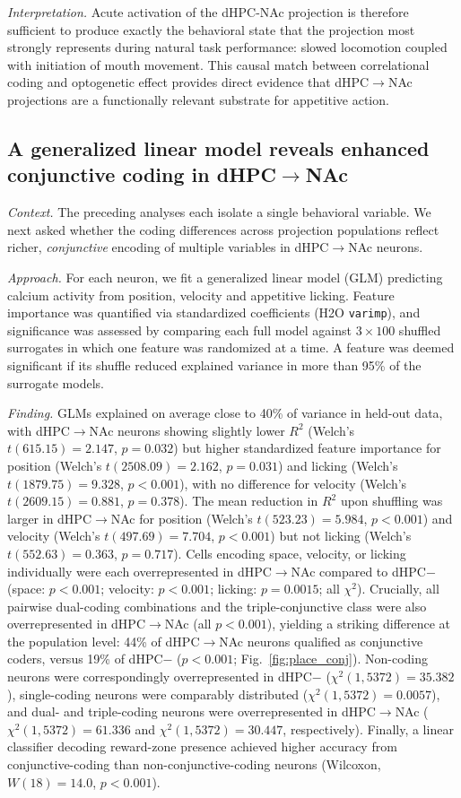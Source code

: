 \documentclass[11pt]{article}
\begin{document}
\textit{Interpretation.} Acute activation of the dHPC-NAc projection is therefore sufficient to produce exactly the behavioral state that the projection most strongly represents during natural task performance: slowed locomotion coupled with initiation of mouth movement. This causal match between correlational coding and optogenetic effect provides direct evidence that dHPC$\rightarrow$NAc projections are a functionally relevant substrate for appetitive action.

\subsection{A generalized linear model reveals enhanced conjunctive coding in dHPC$\rightarrow$NAc}

\textit{Context.} The preceding analyses each isolate a single behavioral variable. We next asked whether the coding differences across projection populations reflect richer, \emph{conjunctive} encoding of multiple variables in dHPC$\rightarrow$NAc neurons.

\textit{Approach.} For each neuron, we fit a generalized linear model (GLM) predicting calcium activity from position, velocity and appetitive licking. Feature importance was quantified via standardized coefficients (H2O \texttt{varimp}), and significance was assessed by comparing each full model against $3\times100$ shuffled surrogates in which one feature was randomized at a time. A feature was deemed significant if its shuffle reduced explained variance in more than 95\% of the surrogate models.

\textit{Finding.} GLMs explained on average close to 40\% of variance in held-out data, with dHPC$\rightarrow$NAc neurons showing slightly lower $R^2$ (Welch's $t(615.15)=2.147$, $p=0.032$) but higher standardized feature importance for position (Welch's $t(2508.09)=2.162$, $p=0.031$) and licking (Welch's $t(1879.75)=9.328$, $p<0.001$), with no difference for velocity (Welch's $t(2609.15)=0.881$, $p=0.378$). The mean reduction in $R^2$ upon shuffling was larger in dHPC$\rightarrow$NAc for position (Welch's $t(523.23)=5.984$, $p<0.001$) and velocity (Welch's $t(497.69)=7.704$, $p<0.001$) but not licking (Welch's $t(552.63)=0.363$, $p=0.717$). Cells encoding space, velocity, or licking individually were each overrepresented in dHPC$\rightarrow$NAc compared to dHPC$-$ (space: $p<0.001$; velocity: $p<0.001$; licking: $p=0.0015$; all $\chi^2$). Crucially, all pairwise dual-coding combinations and the triple-conjunctive class were also overrepresented in dHPC$\rightarrow$NAc (all $p<0.001$), yielding a striking difference at the population level: 44\% of dHPC$\rightarrow$NAc neurons qualified as conjunctive coders, versus 19\% of dHPC$-$ ($p<0.001$; Fig.~\ref{fig:place_conj}). Non-coding neurons were correspondingly overrepresented in dHPC$-$ ($\chi^2(1,5372)=35.382$), single-coding neurons were comparably distributed ($\chi^2(1,5372)=0.0057$), and dual- and triple-coding neurons were overrepresented in dHPC$\rightarrow$NAc ($\chi^2(1,5372)=61.336$ and $\chi^2(1,5372)=30.447$, respectively). Finally, a linear classifier decoding reward-zone presence achieved higher accuracy from conjunctive-coding than non-conjunctive-coding neurons (Wilcoxon, $W(18)=14.0$, $p<0.001$).
\end{document}
